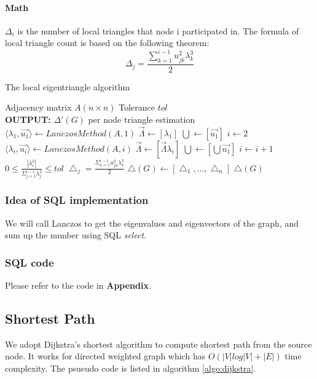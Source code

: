 \paragraph{Math}
$\Delta_{i}$ is the number of local triangles that node i participated in. The formula of local triangle count is based on the following theorem:
\begin{equation}
    \Delta_{j} = \frac{\sum_{k=1}^{i-1}u_{jk}^{2}\lambda_{k}^{3}}{2}
\end{equation}


\begin{algorithm}[!htbf]
\caption{The local eigentriangle algorithm\cite{tsourakakis2008fast}}
\begin{algorithmic}
\REQUIRE Adjacency matrix $A(n \times n)$
\REQUIRE Tolerance $tol$\\
{\bf OUTPUT: } $\Delta'(G)$  per node triangle estimation
\STATE $\langle \lambda_{1},\vec{u_{1}} \rangle \leftarrow LanczosMethod(A,1)$
\STATE $\vec{\Lambda} \leftarrow [\lambda_{1}]$
\STATE $\bigcup \leftarrow [\vec{u_{1}}]$
\STATE $i \leftarrow 2$
\REPEAT
\STATE $\langle \lambda_{i},\vec{u_{i}} \rangle \leftarrow LanczosMethod(A,i)$
\STATE $\vec{\Lambda} \leftarrow [\vec{\Lambda}\lambda_{i}]$
\STATE $\bigcup \leftarrow [\bigcup \vec{u_{1}}]$
\STATE $i \leftarrow i + 1$
\UNTIL $0 \leq \frac{|\lambda_{i}^3|}{\Sigma_{j=1}^{i-1}\lambda_{j}^3} \leq tol$
\STATE $\bigtriangleup_{j} = \frac{\Sigma_{k=1}^{i-1}u_{jk}^2\lambda_{k}^3}{2}$
\ENDFOR
\STATE $\bigtriangleup(G)\leftarrow[\bigtriangleup_{1},\ldots,\bigtriangleup_{n}]$
\RETURN $\bigtriangleup(G)$
\end{algorithmic}
\end{algorithm}




\subsubsection{Idea of SQL implementation}
We will call Lanczos to get the eigenvalues and eigenvectors of the graph, and sum up the number using SQL \emph{select}.

\subsubsection{SQL code}
Please refer to the code in {\bf Appendix}.

\subsection{Shortest Path}
We adopt Dijkstra's shortest algorithm to compute shortest path from the source node. It works for directed weighted
graph which has $O(|V| log |V| + |E|)$ time complexity. The psueudo code is listed in algorithm \ref{algo:dijkstra}.

